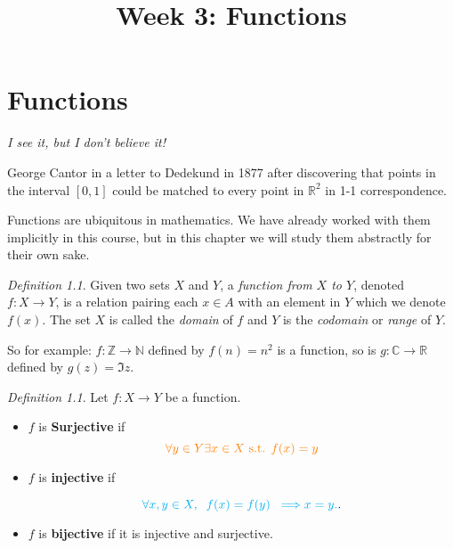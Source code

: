 \documentclass[a4paper,12pt,dvipsnames]{book}
\numberwithin{theorem}{chapter}
\theoremstyle{remark}
\newtheorem{definition}[theorem]{Definition}
\begin{document}
\title{Week 3: Functions}
\date{}

\maketitle


\chapter{Functions}



\epigraph{\it I see it, but I don't believe it!}{George Cantor in a letter to Dedekund in 1877 after discovering that points in the interval $[0,1]$ could be matched to every point in $\mathbb{R}^{2}$ in 1-1 correspondence.} 



Functions are ubiquitous in mathematics. We have already worked with them implicitly in this course, but in this chapter we will study them abstractly for their own sake. 


\begin{definition}
Given two sets $X$ and $Y$, a {\it function from $X$ to $Y$}, denoted $f:X\rightarrow Y$, is a relation pairing each $x\in A$ with an element in $Y$ which we denote $f(x)$. The set $X$ is called the {\it domain} of $f$ and $Y$ is the {\it codomain} or {\it range} of $Y$. 
\end{definition}

So for example: $f:\mathbb{Z}\rightarrow \mathbb{N}$ defined by $f(n)=n^2$ is a function, so is $g:\mathbb{C}\rightarrow \mathbb{R}$ defined by $g(z)=\Im z$. 


\begin{definition}
Let $f:X\rightarrow Y$ be a function. 
\begin{itemize}
\item $f$ is {\bf \color{orange} Surjective} if 
\[
{\color{orange} \forall y\in Y\exists x\in X \mbox{ s.t. } f(x)=y}\]
 
\item $f$ is  {\bf \color{cyan} injective} if

\[
{\color{cyan}  \forall x,y\in X,  \;\; f(x)=f(y) \;\; \Longrightarrow x=y.
}.\]
 
\item $f$ is {\bf \color{ForestGreen} bijective} if it is injective and surjective.
\end{itemize}

\end{definition}
 
\end{document}
